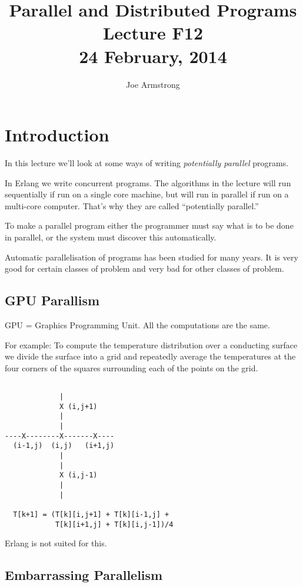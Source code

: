\documentclass[10pt]{article}
\title{Parallel and Distributed Programs\\
Lecture F12\\
24 February, 2014
}
\author{Joe Armstrong}
\begin{document}
\maketitle

\tableofcontents

\section{Introduction}
In this lecture we'll look at some ways of writing {\sl
  potentially parallel} programs.

In Erlang we write concurrent programs. The algorithms in the lecture
will run sequentially if run on a single core machine, but will run
in parallel if run on a multi-core computer. That's why they are
called ``potentially parallel.''


To make a parallel program either the programmer must say what is to be
done in parallel, or the system must discover this automatically.

Automatic parallelisation of programs has been studied for many years.
It is very good for certain classes of problem
and very bad for other classes of problem.

\subsection{GPU Parallism}

GPU = Graphics Programming Unit. All the computations are the same.

For example: To compute the temperature distribution over a conducting
surface we divide the surface into a grid and repeatedly average the
temperatures at the four corners of the squares surrounding each of
the points on the grid.
 
\begin{verbatim}

             | 
             X (i,j+1)
             |
             |
----X--------X-------X----
  (i-1,j)  (i,j)   (i+1,j)   
             |
             |
             X (i,j-1)
             |
             |

  T[k+1] = (T[k][i,j+1] + T[k][i-1,j] + 
            T[k][i+1,j] + T[k][i,j-1])/4
\end{verbatim}

Erlang is not suited for this.

\subsection{Embarrassing Parallelism}
\end{document}
